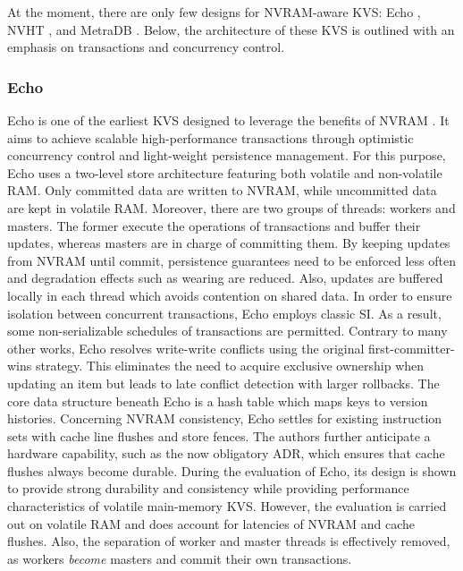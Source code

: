 At the moment, there are only few designs for \ac{NVRAM}-aware \ac{KVS}: Echo
\cite{bailey2013exploring}, NVHT \cite{zhou2016nvht}, and MetraDB
\cite{marmol2016nonvolatile}. Below, the architecture of these \ac{KVS} is
outlined with an emphasis on transactions and concurrency control.

\subsubsection{Echo}

Echo is one of the earliest \ac{KVS} designed to leverage the benefits of
\ac{NVRAM} \cite{bailey2013exploring}. It aims to achieve scalable
high-performance transactions through optimistic concurrency control and
light-weight persistence management. For this purpose, Echo uses a two-level
store architecture featuring both volatile and non-volatile \ac{RAM}. Only
committed data are written to \ac{NVRAM}, while uncommitted data are kept in
volatile \ac{RAM}. Moreover, there are two groups of threads: workers and
masters. The former execute the operations of transactions and buffer their
updates, whereas masters are in charge of committing them. By keeping updates
from \ac{NVRAM} until commit, persistence guarantees need to be enforced less
often and degradation effects such as wearing are reduced. Also, updates are
buffered locally in each thread which avoids contention on shared data. In order
to ensure isolation between concurrent transactions, Echo employs classic
\ac{SI}. As a result, some non-serializable schedules of transactions are
permitted. Contrary to many other works, Echo resolves write-write conflicts
using the original first-committer-wins strategy. This eliminates the need to
acquire exclusive ownership when updating an item but leads to late conflict
detection with larger rollbacks. The core data structure beneath Echo is a hash
table which maps keys to version histories. Concerning \ac{NVRAM} consistency,
Echo settles for existing instruction sets with cache line flushes and store
fences. The authors further anticipate a hardware capability, such as the now
obligatory \ac{ADR}, which ensures that cache flushes always become durable.
During the evaluation of Echo, its design is shown to provide strong durability
and consistency while providing performance characteristics of volatile
main-memory \ac{KVS}. However, the evaluation is carried out on volatile
\ac{RAM} and does account for latencies of \ac{NVRAM} and cache flushes. Also,
the separation of worker and master threads is effectively removed, as workers
\emph{become} masters and commit their own transactions.

